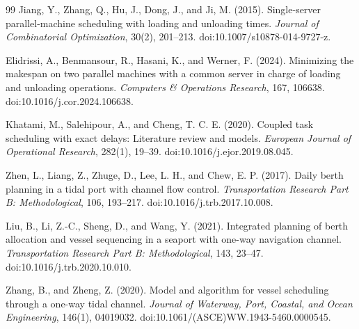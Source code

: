 \documentclass[11pt]{article}
\begin{document}
\begin{thebibliography}{99}
Jiang, Y., Zhang, Q., Hu, J., Dong, J., and Ji, M. (2015).
Single-server parallel-machine scheduling with loading and unloading times.
\emph{Journal of Combinatorial Optimization}, 30(2), 201--213.
doi:10.1007/s10878-014-9727-z.

Elidrissi, A., Benmansour, R., Hasani, K., and Werner, F. (2024).
Minimizing the makespan on two parallel machines with a common server in charge of loading and unloading operations.
\emph{Computers \& Operations Research}, 167, 106638.
doi:10.1016/j.cor.2024.106638.

Khatami, M., Salehipour, A., and Cheng, T. C. E. (2020).
Coupled task scheduling with exact delays: Literature review and models.
\emph{European Journal of Operational Research}, 282(1), 19--39.
doi:10.1016/j.ejor.2019.08.045.

Zhen, L., Liang, Z., Zhuge, D., Lee, L. H., and Chew, E. P. (2017).
Daily berth planning in a tidal port with channel flow control.
\emph{Transportation Research Part B: Methodological}, 106, 193--217.
doi:10.1016/j.trb.2017.10.008.

Liu, B., Li, Z.-C., Sheng, D., and Wang, Y. (2021).
Integrated planning of berth allocation and vessel sequencing in a seaport with one-way navigation channel.
\emph{Transportation Research Part B: Methodological}, 143, 23--47.
doi:10.1016/j.trb.2020.10.010.

Zhang, B., and Zheng, Z. (2020).
Model and algorithm for vessel scheduling through a one-way tidal channel.
\emph{Journal of Waterway, Port, Coastal, and Ocean Engineering}, 146(1), 04019032.
doi:10.1061/(ASCE)WW.1943-5460.0000545.

\end{thebibliography}
\end{document}
